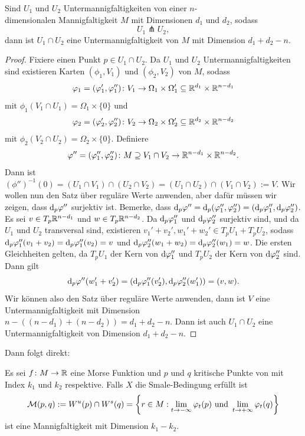 \begin{prop}
    Sind $U_1$ und $U_2$ Untermannigfaltigkeiten von einer $n$-\\
    dimensionalen Mannigfaltigkeit $M$ mit 
    Dimensionen $d_1$ und $d_2$, sodass 
    \[ U_1 \pitchfork U_2 , \]
    dann ist $U_1 \cap U_2$ eine Untermannigfaltigkeit von $M$ mit Dimension $d_1 + d_2 - n$.
\end{prop}

\begin{proof}
    Fixiere einen Punkt $p \in U_1 \cap U_2$. Da $U_1$ und $U_2$ Untermannigfaltigkeiten sind existieren 
    Karten $(\phi_1, V_1)$ und $(\phi_2, V_2)$ von $M$, sodass 
    \[ \varphi_1 = (\varphi_1', \varphi_1'') \colon V_1 \to 
        \Omega_1 \times \Omega_1' \subseteq { \mathbb R }^{d_1} \times { \mathbb R }^{n - d_1} \]
    mit $\phi_1(V_1 \cap U_1) = \Omega_1 \times \{ 0 \}$ und 
    \[ \varphi_2 = (\varphi_2', \varphi_2'')\colon V_2 \to 
        \Omega_2 \times \Omega_2' \subseteq { \mathbb R }^{d_2} \times { \mathbb R }^{n - d_2} \]
    mit $\phi_2(V_2 \cap U_2) = \Omega_2 \times \{ 0 \}$. Definiere 
    \[ \varphi'' = (\varphi_1'', \varphi_2'') \colon 
        M \supseteq V_1 \cap V_2 \to { \mathbb R }^{n - d_1} \times { \mathbb R }^{n - d_2}. \]
    Dann ist 
    $(\phi'')^{-1}(0) = (U_1 \cap V_1) \cap (U_2 \cap V_2) = (U_1 \cap U_2) \cap (V_1 \cap V_2) := V$.
    Wir wollen nun den Satz über reguläre Werte anwenden, aber dafür müssen wir zeigen, dass 
    ${ \operatorname{d} }_p \varphi''$ surjektiv ist. Bemerke, dass 
    ${ \operatorname{d} }_p \varphi'' = { \operatorname{d} }_p (\varphi''_1, \varphi''_2) = ({ \operatorname{d} }_p \varphi''_1, { \operatorname{d} }_p \varphi''_2)$.
    Es sei $v \in T_p{ \mathbb R }^{n - d_1}$ und $w \in T_p{ \mathbb R }^{n - d_2}$. Da ${ \operatorname{d} }_p \varphi''_1$ und 
    ${ \operatorname{d} }_p \varphi''_2$ surjektiv sind, und da $U_1$ und $U_2$ transversal sind, 
    existieren $v_1' + v_2', w_1' + w_2' \in T_pU_1 + T_pU_2$, sodass 
    ${ \operatorname{d} }_p \varphi''_1 (v_1 + v_2) = { \operatorname{d} }_p \varphi''_1 (v_2) = v$ und 
    ${ \operatorname{d} }_p \varphi''_2 (w_1 + w_2) = { \operatorname{d} }_p \varphi''_2 (w_1) = w$.
    Die ersten Gleichheiten gelten, da $T_pU_1$ der Kern von ${ \operatorname{d} } \varphi''_1$ und 
    $T_pU_2$ der Kern von ${ \operatorname{d} } \varphi''_2$ sind. Dann gilt
    \[ { \operatorname{d} }_p \varphi'' (w_1' + v_2')  = ( { \operatorname{d} }_p \varphi''_1 (v_2'), { \operatorname{d} }_p \varphi''_2 (w_1')) = (v, w) . \]
    Wir können also den Satz über reguläre Werte anwenden, dann ist $V$ eine Untermannigfaltigkeit
    mit Dimension $n - ((n - d_1) + (n - d_2)) = d_1 + d_2 - n$. Dann ist auch $U_1 \cap U_2$
    eine Untermannigfaltigkeit von Dimension $d_1 + d_2 - n$.
\end{proof}

Dann folgt direkt:

\begin{prop}
    Es sei $f \colon M \to { \mathbb R }$ eine Morse Funktion und $p$ und $q$ kritische Punkte von mit Index $k_1$
    und $k_2$ respektive. Falls $X$ die Smale-Bedingung erfüllt ist
    \[ \mathcal{M} (p, q) := { W^u } (p) \cap { W^s } (q) = 
        \left\{ r \in M : \lim_{t \to - \infty} \varphi_t(p) \text{ und } 
        \lim_{t \to + \infty} \varphi_t(q) \right\} \]
    ist eine Mannigfaltigkeit mit Dimension $k_1 - k_2$.
\end{prop}

